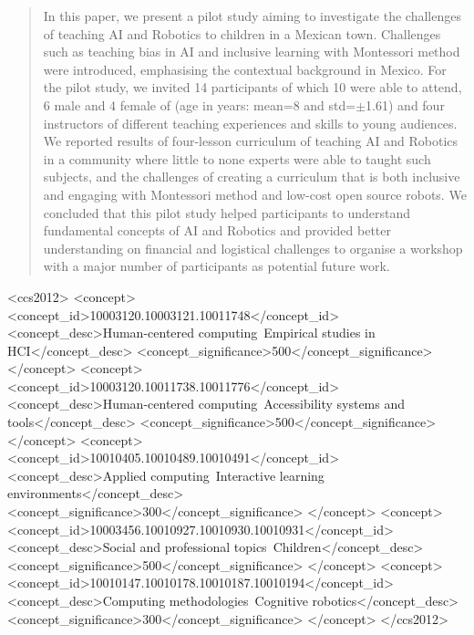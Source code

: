 \documentclass[sigconf,anonymous,review]{acmart}
\begin{document}
\renewcommand{\shortauthors}{Trovato and Tobin, et al.}

\begin{abstract}
In this paper, we present a pilot study aiming to investigate the challenges of teaching AI and Robotics to children in a Mexican town.
Challenges such as teaching bias in AI and inclusive learning with Montessori method were introduced, emphasising the contextual background in Mexico.
For the pilot study, we invited 14 participants of which 10 were able to attend, 6 male and 4 female of (age in years: mean=8 and std=$\pm$1.61) and four instructors of different teaching experiences and skills to young audiences.
We reported results of four-lesson curriculum of teaching AI and Robotics in a community where little to none experts were able to taught such subjects, and the challenges of creating a curriculum that is both inclusive and engaging with Montessori method and low-cost open source robots. 
We concluded that this pilot study helped participants to understand fundamental concepts of AI and Robotics and provided better understanding on financial and logistical challenges to organise a workshop with a major number of participants as potential future work.
\end{abstract}

\begin{CCSXML}
<ccs2012>
     <concept>
         <concept_id>10003120.10003121.10011748</concept_id>
         <concept_desc>Human-centered computing~Empirical studies in HCI</concept_desc>
         <concept_significance>500</concept_significance>
         </concept>
     <concept>
         <concept_id>10003120.10011738.10011776</concept_id>
         <concept_desc>Human-centered computing~Accessibility systems and tools</concept_desc>
         <concept_significance>500</concept_significance>
         </concept>
     <concept>
         <concept_id>10010405.10010489.10010491</concept_id>
         <concept_desc>Applied computing~Interactive learning environments</concept_desc>
         <concept_significance>300</concept_significance>
         </concept>
     <concept>
         <concept_id>10003456.10010927.10010930.10010931</concept_id>
         <concept_desc>Social and professional topics~Children</concept_desc>
         <concept_significance>500</concept_significance>
         </concept>
     <concept>
         <concept_id>10010147.10010178.10010187.10010194</concept_id>
         <concept_desc>Computing methodologies~Cognitive robotics</concept_desc>
         <concept_significance>300</concept_significance>
         </concept>
</ccs2012>
\end{CCSXML}
\end{document}

